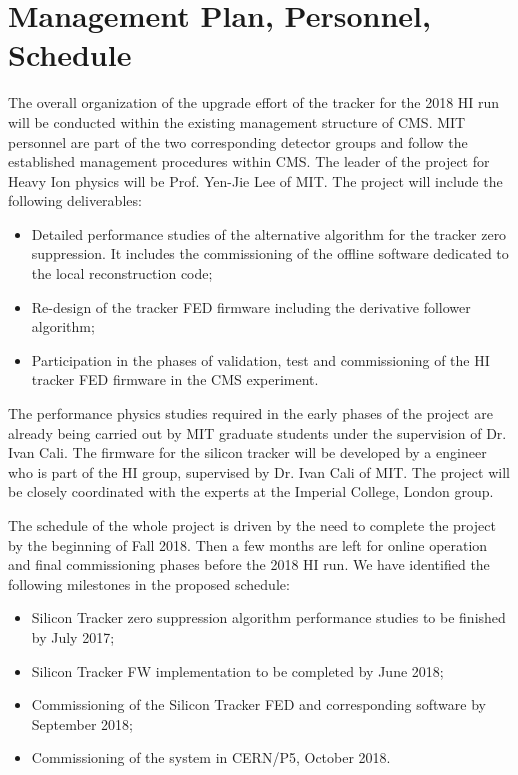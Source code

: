 \section{Management Plan, Personnel, Schedule}
\label{sec:management}

The overall organization of the upgrade effort of the tracker%
for the 2018 HI run will be conducted within the existing management structure of CMS. MIT personnel are part of the two corresponding detector groups and follow the established management procedures within CMS. The leader of the project for Heavy Ion physics will be Prof. Yen-Jie Lee of MIT. The project will include the following deliverables:

\begin{itemize}
\item Detailed performance studies of the alternative algorithm for the tracker zero suppression. It includes the commissioning of the offline software dedicated to the local reconstruction code;
\item Re-design of the tracker FED firmware including the derivative follower algorithm;
\item Participation in the phases of validation, test and commissioning of the HI tracker FED firmware in the CMS experiment.
\end{itemize}

The performance physics studies required in the early phases of the project are already being carried out by MIT graduate students under the supervision of Dr. Ivan Cali. The firmware for the silicon tracker will be developed by a engineer who is part of the HI group, supervised by Dr. Ivan Cali of MIT. The project will be closely coordinated with the experts at the Imperial College, London group.

The schedule of the whole project is driven by the need to complete the project by the beginning of Fall 2018. Then a few months are left for online operation and final commissioning phases before the 2018 HI run. We have identified the following milestones in the proposed schedule:

\begin{itemize}
\item Silicon Tracker zero suppression algorithm performance studies to be finished by July 2017;
\item Silicon Tracker FW implementation to be completed by June 2018;
\item Commissioning of the Silicon Tracker FED and corresponding software by September 2018;
\item Commissioning of the system in CERN/P5, October 2018.
\end{itemize}
